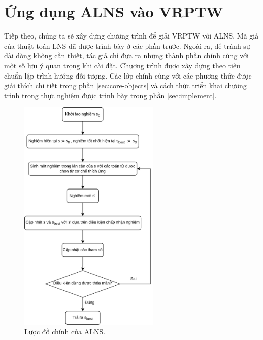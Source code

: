 \section{Ứng dụng ALNS vào VRPTW}

Tiếp theo, chúng ta sẽ xây dựng chương trình để giải VRPTW với ALNS. Mã giả của thuật toán LNS đã được trình bày ở các phần trước. Ngoài ra, để tránh sự dài dòng không cần thiết, tác giả chỉ đưa ra những thành phần chính cùng với một số lưu ý quan trọng khi cài đặt. Chương trình được xây dựng theo tiêu chuẩn lập trình hướng đối tượng. Các lớp chính cùng với các phương thức được giải thích chi tiết trong phần \ref{sec:core-objects} và cách thức triển khai chương trình trong thực nghiệm được trình bày trong phần \ref{sec:implement}.

\begin{figure}[H] %
  \centering %
  \includegraphics[width=0.6\textwidth]{figures/ALNS-flowchart.png} 
  \caption{Lược đồ chính của ALNS.} 
\end{figure}


